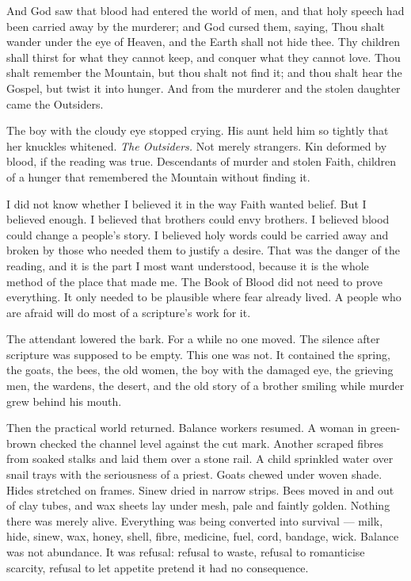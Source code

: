 \begin{scripture}
And God saw that blood had entered the world of men, and that holy speech had been carried away by the murderer; and God cursed them, saying, Thou shalt wander under the eye of Heaven, and the Earth shall not hide thee.
Thy children shall thirst for what they cannot keep, and conquer what they cannot love.
Thou shalt remember the Mountain, but thou shalt not find it; and thou shalt hear the Gospel, but twist it into hunger.
And from the murderer and the stolen daughter came the Outsiders.
\end{scripture}
The boy with the cloudy eye stopped crying. His aunt held him so tightly that her knuckles whitened. \textit{The Outsiders.} Not merely strangers. Kin deformed by blood, if the reading was true. Descendants of murder and stolen Faith, children of a hunger that remembered the Mountain without finding it.\par

I did not know whether I believed it in the way Faith wanted belief. But I believed enough. I believed that brothers could envy brothers. I believed blood could change a people's story. I believed holy words could be carried away and broken by those who needed them to justify a desire. That was the danger of the reading, and it is the part I most want understood, because it is the whole method of the place that made me. The Book of Blood did not need to prove everything. It only needed to be plausible where fear already lived. A people who are afraid will do most of a scripture's work for it.\par

The attendant lowered the bark. For a while no one moved. The silence after scripture was supposed to be empty. This one was not. It contained the spring, the goats, the bees, the old women, the boy with the damaged eye, the grieving men, the wardens, the desert, and the old story of a brother smiling while murder grew behind his mouth.\par

Then the practical world returned. Balance workers resumed. A woman in green-brown checked the channel level against the cut mark. Another scraped fibres from soaked stalks and laid them over a stone rail. A child sprinkled water over snail trays with the seriousness of a priest. Goats chewed under woven shade. Hides stretched on frames. Sinew dried in narrow strips. Bees moved in and out of clay tubes, and wax sheets lay under mesh, pale and faintly golden. Nothing there was merely alive. Everything was being converted into survival --- milk, hide, sinew, wax, honey, shell, fibre, medicine, fuel, cord, bandage, wick. Balance was not abundance. It was refusal: refusal to waste, refusal to romanticise scarcity, refusal to let appetite pretend it had no consequence.\par

